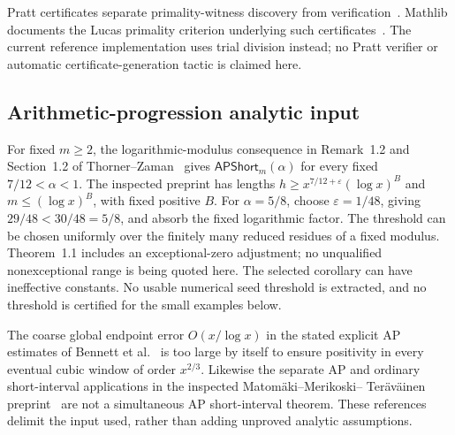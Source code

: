 \documentclass[11pt,reqno]{amsart}
\theoremstyle{blueplain}
\numberwithin{equation}{section}
\begin{document}
Pratt certificates separate primality-witness discovery from
verification~\cite{Pratt1975}. Mathlib documents the Lucas primality
criterion underlying such certificates~\cite{MathlibLucas}. The current
reference implementation uses trial division instead; no Pratt verifier
or automatic certificate-generation tactic is claimed here.



\subsection{Arithmetic-progression analytic input}\label{sec:ap-input}
For fixed \(m\ge2\), the logarithmic-modulus consequence in Remark~1.2
and Section~1.2 of Thorner--Zaman~\cite{ThornerZaman2024} gives
\(\textsf{APShort}_m(\alpha)\) for every fixed \(7/12<\alpha<1\).
The inspected preprint has lengths
\(h\ge x^{7/12+\varepsilon}(\log x)^B\) and
\(m\le(\log x)^B\), with fixed positive \(B\). For \(\alpha=5/8\),
choose \(\varepsilon=1/48\), giving \(29/48<30/48=5/8\), and absorb
the fixed logarithmic factor. The threshold can be chosen uniformly
over the finitely many reduced residues of a fixed modulus.
Theorem~1.1 includes an exceptional-zero adjustment; no unqualified
nonexceptional range is being quoted here. The selected corollary can
have ineffective constants. No usable numerical seed threshold is
extracted, and no threshold is certified for the small examples below.

The coarse global endpoint error \(O(x/\log x)\) in the stated explicit
AP estimates of Bennett et al.~\cite{BennettMartinOBryantRechnitzer2018}
is too large by itself to ensure positivity in every eventual cubic
window of order \(x^{2/3}\). Likewise the separate AP and ordinary
short-interval applications in the inspected Matom\"aki--Merikoski--
Ter\"av\"ainen preprint~\cite{MatomakiMerikoskiTeravainen2024} are not a
simultaneous AP short-interval theorem. These references delimit the
input used, rather than adding unproved analytic assumptions.
\end{document}
